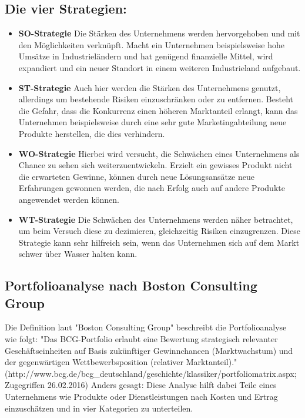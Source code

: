     \subsection*{Die vier Strategien:}
    \begin{itemize}
      \item \textbf{SO-Strategie}
      Die Stärken des Unternehmens werden hervorgehoben und mit den Möglichkeiten verknüpft. Macht ein Unternehmen beispielsweise hohe Umsätze in Industrieländern und hat
      genügend finanzielle Mittel, wird expandiert und ein neuer Standort in einem weiteren Industrieland aufgebaut.

      \item \textbf{ST-Strategie}
      Auch hier werden die Stärken des Unternehmens genutzt, allerdings um bestehende Risiken einzuschränken oder zu entfernen. Besteht die Gefahr, dass die Konkurrenz
      einen höheren Marktanteil erlangt, kann das Unternehmen beispielsweise durch eine sehr gute Marketingabteilung neue Produkte herstellen, die dies verhindern.

      \item \textbf{WO-Strategie}
      Hierbei wird versucht, die Schwächen eines Unternehmens als Chance zu sehen sich weiterzuentwickeln. Erzielt ein gewisses Produkt nicht die erwarteten Gewinne,
      können durch neue Lösungsansätze neue Erfahrungen gewonnen werden, die nach Erfolg auch auf andere Produkte angewendet werden können.

      \item \textbf{WT-Strategie}
      Die Schwächen des Unternehmens werden näher betrachtet, um beim Versuch diese zu dezimieren, gleichzeitig Risiken einzugrenzen. Diese Strategie kann sehr hilfreich
      sein, wenn das Unternehmen sich auf dem Markt schwer über Wasser halten kann.
    \end{itemize}

    \subsection*{Portfolioanalyse nach Boston Consulting Group}
    Die Definition laut {"Boston Consulting Group"\cite{portfolioanalyse}} beschreibt die Portfolioanalyse wie folgt:
    "Das BCG-Portfolio erlaubt eine Bewertung strategisch relevanter Geschäftseinheiten auf Basis zukünftiger Gewinnchancen (Marktwachstum) und der
    gegenwärtigen Wettbewerbsposition (relativer Marktanteil)." (http://www.bcg.de/bcg_deutschland/geschichte/klassiker/portfoliomatrix.aspx; Zugegriffen 26.02.2016)
    Anders gesagt: Diese Analyse hilft dabei Teile eines Unternehmens wie Produkte oder Dienstleistungen
    nach Kosten und Ertrag einzuschätzen und in vier Kategorien zu unterteilen.

